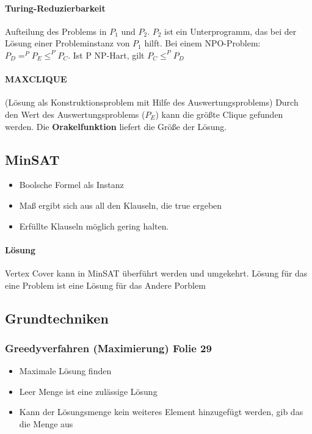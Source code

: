 \documentclass[ngerman]{scrartcl}
\begin{document}
\paragraph{Turing-Reduzierbarkeit} Aufteilung des Problems in $ P_1 $ und $ P_2 $. $ P_2 $ ist ein Unterprogramm, das bei der Lösung einer Probleminstanz von $ P_1 $  hilft.
Bei einem NPO-Problem: $ P_D =^P P_E \leq^P P_C $. Ist P NP-Hart, gilt $ P_C \leq^P P_D $
\paragraph{MAXCLIQUE} (Lösung als Konstruktionsproblem mit Hilfe des Auswertungsproblems) Durch den Wert des Auswertungsproblems ($ P_E $) kann die größte Clique gefunden werden. Die \textbf{Orakelfunktion} liefert die Größe der Lösung.  

\subsection*{MinSAT}
\begin{itemize}
  \item Boolsche Formel als Instanz
  \item Maß ergibt sich aus all den Klauseln, die true ergeben
  \item Erfüllte Klauseln möglich gering halten. 
\end{itemize}
\paragraph{Lösung} Vertex Cover kann in MinSAT überführt werden und umgekehrt. Lösung für das eine Problem ist eine Lösung für das Andere Porblem

\subsection{Grundtechniken}
\subsubsection{Greedyverfahren (Maximierung) Folie 29}
\begin{itemize}
  \item Maximale Lösung finden
  \item Leer Menge ist eine zulässige Lösung
  \item Kann der Lösungsmenge kein weiteres Element hinzugefügt werden, gib das die Menge aus
\end{itemize}
\end{document}
